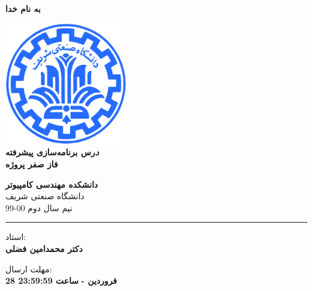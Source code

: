 \documentclass[]{article}
\begin{document}
\begin{titlepage}
\begin{center}

\textbf{ \Huge{به نام خدا} }
        
\vspace{0.2cm}

\includegraphics[width=0.4\textwidth]{sharif1.png}\\
\vspace{0.2cm}
\textbf{ \Huge{\emph درس برنامه‌سازی پیشرفته} }\\
\vspace{0.25cm}
\textbf{ \Large{ فاز صفر پروژه} }
\vspace{0.2cm}
       
 
      \large \textbf{دانشکده مهندسی کامپیوتر}\\\vspace{0.1cm}
    \large   دانشگاه صنعتی شریف\\\vspace{0.2cm}
       \large   ﻧﯿﻢ سال دوم 00-99 \\\vspace{0.10cm}
      \noindent\rule[1ex]{\linewidth}{1pt}
استاد:\\
    \textbf{{دکتر محمدامین فضلی}}



    \vspace{0.20cm}

   مهلت ارسال:\\
    \textbf{{28 فروردین - }}
    \textbf{{ساعت 23:59:59}}

    \vspace{0.10cm}



\end{center}
\end{titlepage}


\newpage
\pagestyle{fancy}
\fancyhf{}
\fancyfoot{}
\cfoot{\thepage}
\renewcommand{\headrulewidth}{2pt}
\end{document}
